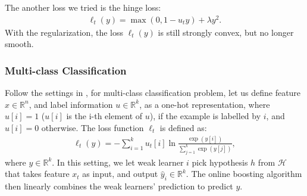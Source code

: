 The another loss we tried is the hinge loss:
\begin{align}
\ell_t(y) = \max(0, 1 - u_t y) + \lambda y^2.
\end{align}With the regularization, the loss $\ell_t(y)$ is still strongly convex, but no longer smooth. 



\subsubsection{Multi-class Classification}
Follow the settings in \citep{friedman2001greedy}, for multi-class classification problem, let us define feature $x\in\mathbb{R}^n$, and label information $u\in\mathbb{R}^k$, as a one-hot representation, where $u[i] = 1$ ($u[i]$ is the i-th element of $u$), if the example is labelled by $i$, and $u[i] = 0$ otherwise. The loss function $\ell_t$ is defined as:
\begin{align}
\ell_t(y) = -\sum_{i=1}^k u_t[i]\ln \frac{\exp(y[i])}{\sum_{j=1}^k\exp(y[j])},
\end{align} where $y\in\mathbb{R}^k$. In this setting, we let  weak learner $i$ pick hypothesis $h$ from $\mathcal{H}$ that takes feature $x_t$ as input, and output $\hat{y}_i\in\mathbb{R}^k$. The online boosting algorithm then linearly combines the weak learners' prediction to predict $y$. 



